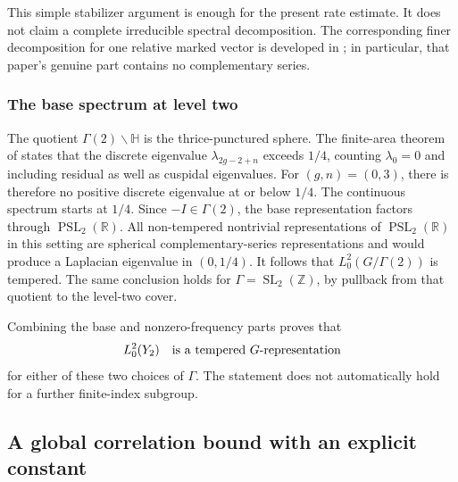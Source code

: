 \documentclass[11pt,a4paper]{article}
\numberwithin{equation}{section}
\theoremstyle{definition}
\theoremstyle{remark}
\newcommand{\HH}{\mathbb H}
\newcommand{\RR}{\mathbb R}
\newcommand{\ZZ}{\mathbb Z}
\begin{document}
This simple stabilizer argument is enough for the present rate
estimate. It does not claim a complete irreducible spectral
decomposition. The corresponding finer decomposition for one
relative marked vector is developed in
\cite{AthreyaLagaceMollerRaum}; in particular, that paper's genuine
part contains no complementary series.

\subsubsection*{The base spectrum at level two}

The quotient $\Gamma(2)\backslash\HH$ is the thrice-punctured
sphere. The finite-area theorem of
\cite[Theorem 2]{OtalRosas} states that the discrete eigenvalue
$\lambda_{2g-2+n}$ exceeds $1/4$, counting $\lambda_0=0$ and
including residual as well as cuspidal eigenvalues. For $(g,n)=(0,3)$,
there is therefore no positive discrete eigenvalue at or below
$1/4$. The continuous spectrum starts at $1/4$.
Since $-I\in\Gamma(2)$, the base representation factors through
$\operatorname{PSL}_2(\RR)$. All non-tempered nontrivial representations of
$\operatorname{PSL}_2(\RR)$ in this setting are spherical
complementary-series representations and would produce a
Laplacian eigenvalue in $(0,1/4)$. It follows that
$L^2_0(G/\Gamma(2))$ is tempered. The same conclusion holds for
$\Gamma=\operatorname{SL}_2(\ZZ)$, by pullback from that quotient
to the level-two cover.

Combining the base and nonzero-frequency parts proves that
\begin{equation}
 L^2_0(Y_2)\quad\hbox{is a tempered $G$-representation}
 \label{eq:markedtorusalltempered}
\end{equation}
for either of these two choices of $\Gamma$. The statement does
not automatically hold for a further finite-index subgroup.

\subsection{A global correlation bound with an explicit constant}
\end{document}
